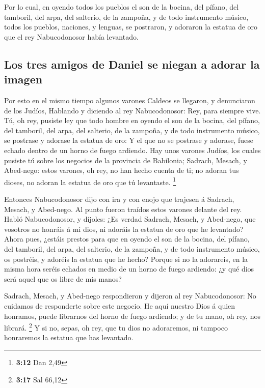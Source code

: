  Por lo cual, en oyendo todos los pueblos el son de la
bocina, del pífano, del tamboril, del arpa, del salterio, de la zampoña,
y de todo instrumento músico, todos los pueblos, naciones, y lenguas, se
postraron, y adoraron la estatua de oro que el rey Nabucodonosor había
levantado.

\hypertarget{los-tres-amigos-de-daniel-se-niegan-a-adorar-la-imagen}{%
\subsection{Los tres amigos de Daniel se niegan a adorar la
imagen}\label{los-tres-amigos-de-daniel-se-niegan-a-adorar-la-imagen}}

 Por esto en el mismo tiempo algunos varones Caldeos se
llegaron, y denunciaron de los Judíos,  Hablando y
diciendo al rey Nabucodonosor: Rey, para siempre vive. 
Tú, oh rey, pusiste ley que todo hombre en oyendo el son de la bocina,
del pífano, del tamboril, del arpa, del salterio, de la zampoña, y de
todo instrumento músico, se postrase y adorase la estatua de oro:
 Y el que no se postrase y adorase, fuese echado dentro
de un horno de fuego ardiendo.  Hay unos varones Judíos,
los cuales pusiste tú sobre los negocios de la provincia de Babilonia;
Sadrach, Mesach, y Abed-nego: estos varones, oh rey, no han hecho cuenta
de ti; no adoran tus dioses, no adoran la estatua de oro que tú
levantaste. \footnote{\textbf{3:12} Dan 2,49}

 Entonces Nabucodonosor dijo con ira y con enojo que
trajesen á Sadrach, Mesach, y Abed-nego. Al punto fueron traídos estos
varones delante del rey.  Habló Nabucodonosor, y díjoles:
¿Es verdad Sadrach, Mesach, y Abed-nego, que vosotros no honráis á mi
dios, ni adoráis la estatua de oro que he levantado? 
Ahora pues, ¿estáis prestos para que en oyendo el son de la bocina, del
pífano, del tamboril, del arpa, del salterio, de la zampoña, y de todo
instrumento músico, os postréis, y adoréis la estatua que he hecho?
Porque si no la adorareis, en la misma hora seréis echados en medio de
un horno de fuego ardiendo: ¿y qué dios será aquel que os libre de mis
manos?

 Sadrach, Mesach, y Abed-nego respondieron y dijeron al
rey Nabucodonosor: No cuidamos de responderte sobre este negocio.
 He aquí nuestro Dios á quien honramos, puede librarnos
del horno de fuego ardiendo; y de tu mano, oh rey, nos librará.
\footnote{\textbf{3:17} Sal 66,12}  Y si no, sepas, oh
rey, que tu dios no adoraremos, ni tampoco honraremos la estatua que has
levantado.

